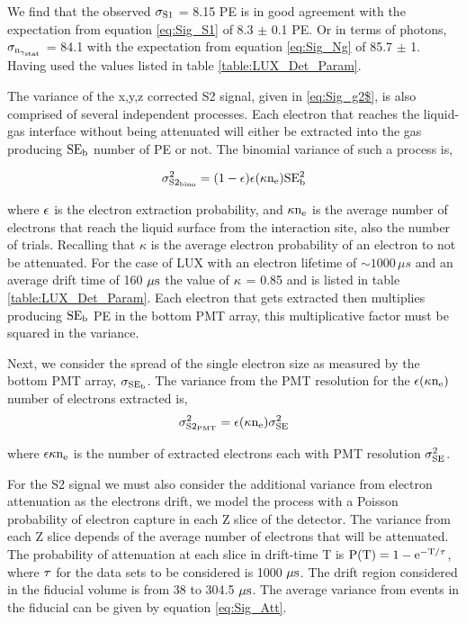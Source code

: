 \newpage

\noindent We find that the observed $\rm \sigma_{S1}$ = 8.15 PE is in good agreement with the expectation from equation \ref{eq:Sig_S1} of 8.3 $\pm$ 0.1 PE. Or in terms of photons, $\rm \sigma_{n_{\gamma_{stat}}}$ = 84.1 with the expectation from equation \ref{eq:Sig_Ng} of 85.7 $\pm$ 1. Having used the values listed in table \ref{table:LUX_Det_Param}.


The variance of the x,y,z corrected S2 signal, given in \ref{eq:Sig_g2$},  is also comprised of several independent processes. Each electron that reaches the liquid-gas interface without being attenuated will either be extracted into the gas producing $\rm SE_b$ number of PE or not. The binomial variance of such a process is,

\begin{equation}
\rm \sigma_{S2_{bino}}^2= (1-\epsilon) \epsilon (\kappa n_e) SE_{b}^2 
\label{eq:Sig_S2}
\end{equation}

\noindent where $\rm \epsilon$ is the electron extraction probability, and $\rm \kappa n_e$ is the average number of electrons that reach the liquid surface from the interaction site, also the number of trials. Recalling that $\kappa$ is the average electron probability of an electron to not be attenuated. For the case of LUX with an electron lifetime of $\sim 1000 \, \mu s$ and an average drift time of 160 $\rm  \mu s$ the value of $\rm \kappa$ = 0.85 and is listed in table \ref{table:LUX_Det_Param}. Each electron that gets extracted then multiplies producing $\rm SE_b$ PE in the bottom PMT array, this multiplicative factor must be squared in the variance. 

Next, we consider the spread of the single electron size as measured by the bottom PMT array, $\rm \sigma_{SE_{b}}$. The variance from the PMT resolution for the $\rm \epsilon (\kappa n_e)$ number of electrons extracted is,
\begin{equation}
\rm \sigma_{S2_{PMT}}^2 = \epsilon (\kappa n_e)  \sigma_{SE}^2
\label{eq:S2_PMT}
\end{equation}

\noindent where $\rm \epsilon \kappa n_e$ is the number of extracted electrons each with PMT resolution $\rm \sigma_{SE}^2$.

For the S2 signal we must also consider the additional variance from electron attenuation as the electrons drift, we model the process with a Poisson probability of electron capture in each Z slice of the detector. The variance from each Z slice depends of the average number of electrons that will be attenuated. The probability of attenuation at each slice in drift-time T is $\rm P(T)= 1-e^{-T/\tau}$, where $\rm \tau$ for the data sets to be considered is 1000 $\rm \mu s$. The drift region considered in the fiducial volume is from 38 to 304.5 $\rm \mu s$. The average variance from events in the fiducial can be given by equation \ref{eq:Sig_Att}.


